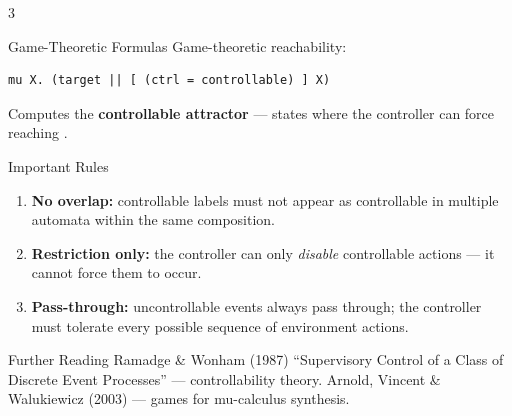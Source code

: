 \begin{multicols}{3}
\begin{tipbox}{Game-Theoretic Formulas}
Game-theoretic reachability:
\begin{lstlisting}[style=ctxdsl]
mu X. (target || [ (ctrl = controllable) ] X)
\end{lstlisting}
Computes the \textbf{controllable attractor} --- states where
the controller can force reaching .
\end{tipbox}

\begin{warnbox}{Important Rules}
\begin{enumerate}[leftmargin=*]
  \item \textbf{No overlap:} controllable labels must not
        appear as controllable in multiple automata within
        the same composition.
  \item \textbf{Restriction only:} the controller can only
        \emph{disable} controllable actions --- it cannot
        force them to occur.
  \item \textbf{Pass-through:} uncontrollable events always
        pass through; the controller must tolerate every
        possible sequence of environment actions.
\end{enumerate}
\end{warnbox}

\begin{tipbox}{Further Reading}
Ramadge \& Wonham (1987) ``Supervisory Control of a Class of Discrete Event Processes'' --- controllability theory.
Arnold, Vincent \& Walukiewicz (2003) --- games for mu-calculus synthesis.
\end{tipbox}

\end{multicols}

